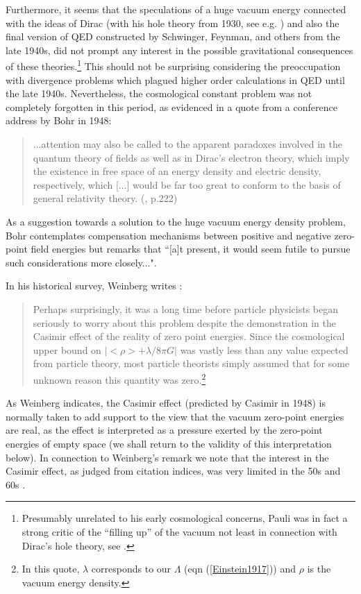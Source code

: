 \documentclass[12pt]{article}
\begin{document}
Furthermore, it seems that the speculations of a huge vacuum
energy connected with the ideas of Dirac (with his hole theory
from 1930, see e.g. \cite{schweber94}) and also the final version
of QED constructed by Schwinger, Feynman, and others from the late
1940s, did not prompt any interest in the possible gravitational
consequences of these theories.\footnote{Presumably unrelated
to his early cosmological concerns, Pauli was in fact a strong
critic of the ``filling up'' of the vacuum not least in connection
with Dirac's hole theory, see \cite{weisskopf83}.} This should not
be surprising considering the preoccupation with divergence
problems which plagued higher order calculations in QED until the
late 1940s. Nevertheless, the cosmological constant problem was
not completely forgotten in this period, as evidenced in a 
quote from a conference address by Bohr in 1948:

\begin{quote}
...attention may also be called to the apparent paradoxes
involved in the quantum theory of fields as well as in Dirac's
electron theory, which imply the existence in free space of an
energy density and electric density, respectively, which [...]
would be far too great to conform to the basis of general
relativity theory. (\cite{bohr48}, p.222) 
\end{quote}
As a suggestion towards a solution to the huge vacuum energy density
problem, Bohr contemplates compensation mechanisms between
positive and negative zero-point field energies but remarks that
``[a]t present, it would seem futile to pursue such considerations
more closely...". 

In his historical survey, Weinberg writes \cite{Weinberg89}:
\begin{quote} 
Perhaps surprisingly, it was a long time before
particle physicists began seriously to worry about this problem
despite the demonstration in the Casimir effect of the reality of
zero point energies. Since the cosmological upper bound on $ | <
\rho > + \lambda / 8 \pi G | $ was vastly less than any value
expected from particle theory, most particle theorists simply
assumed that for some unknown reason this quantity was 
zero.\footnote{In
this quote, $\lambda$ corresponds to our $\Lambda$ (eqn
(\ref{Einstein1917})) and $\rho$ is the vacuum energy density.}
\end{quote} 
As Weinberg indicates, the Casimir effect (predicted by Casimir in
1948) is normally taken to add support to the view that the vacuum
zero-point energies are real, as the effect is interpreted as a
pressure exerted by the zero-point energies of empty space (we shall
return to the validity of this interpretation below). In connection to
Weinberg's remark we note that the interest in the Casimir effect, as
judged from citation indices, was very limited in the 50s and 60s
\cite{rugh98}.
\end{document}
